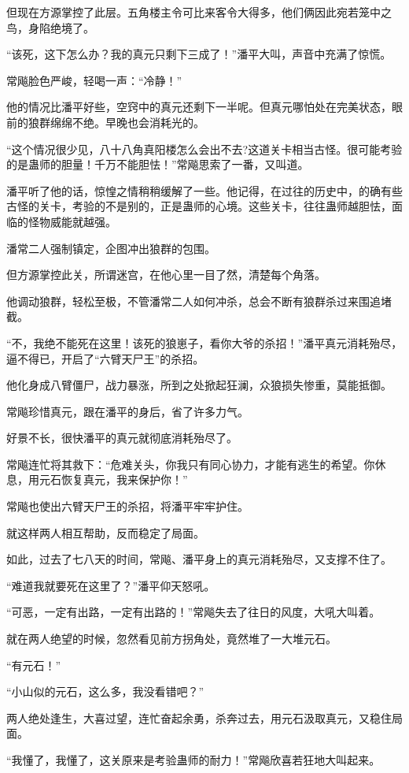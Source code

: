 \begin{this_body}
但现在方源掌控了此层。五角楼主令可比来客令大得多，他们俩因此宛若笼中之鸟，身陷绝境了。

“该死，这下怎么办？我的真元只剩下三成了！”潘平大叫，声音中充满了惊慌。

常飚脸色严峻，轻喝一声：“冷静！”

他的情况比潘平好些，空窍中的真元还剩下一半呢。但真元哪怕处在完美状态，眼前的狼群绵绵不绝。早晚也会消耗光的。

“这个情况很少见，八十八角真阳楼怎么会出不去?这道关卡相当古怪。很可能考验的是蛊师的胆量！千万不能胆怯！”常飚思索了一番，又叫道。

潘平听了他的话，惊惶之情稍稍缓解了一些。他记得，在过往的历史中，的确有些古怪的关卡，考验的不是别的，正是蛊师的心境。这些关卡，往往蛊师越胆怯，面临的怪物威能就越强。

潘常二人强制镇定，企图冲出狼群的包围。

但方源掌控此关，所谓迷宫，在他心里一目了然，清楚每个角落。

他调动狼群，轻松至极，不管潘常二人如何冲杀，总会不断有狼群杀过来围追堵截。

“不，我绝不能死在这里！该死的狼崽子，看你大爷的杀招！”潘平真元消耗殆尽，逼不得已，开启了“六臂天尸王”的杀招。

他化身成八臂僵尸，战力暴涨，所到之处掀起狂澜，众狼损失惨重，莫能抵御。

常飚珍惜真元，跟在潘平的身后，省了许多力气。

好景不长，很快潘平的真元就彻底消耗殆尽了。

常飚连忙将其救下：“危难关头，你我只有同心协力，才能有逃生的希望。你休息，用元石恢复真元，我来保护你！”

常飚也使出六臂天尸王的杀招，将潘平牢牢护住。

就这样两人相互帮助，反而稳定了局面。

如此，过去了七八天的时间，常飚、潘平身上的真元消耗殆尽，又支撑不住了。

“难道我就要死在这里了？”潘平仰天怒吼。

“可恶，一定有出路，一定有出路的！”常飚失去了往日的风度，大吼大叫着。

就在两人绝望的时候，忽然看见前方拐角处，竟然堆了一大堆元石。

“有元石！”

“小山似的元石，这么多，我没看错吧？”

两人绝处逢生，大喜过望，连忙奋起余勇，杀奔过去，用元石汲取真元，又稳住局面。

“我懂了，我懂了，这关原来是考验蛊师的耐力！”常飚欣喜若狂地大叫起来。


\end{this_body}
